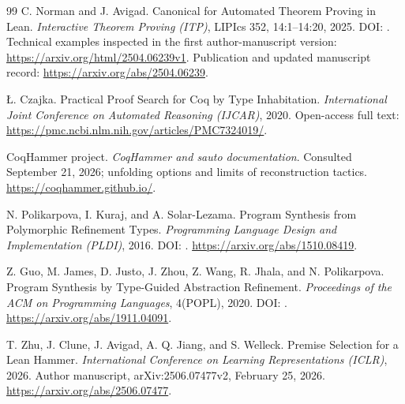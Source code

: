 \begin{thebibliography}{99}
C. Norman and J. Avigad.
Canonical for Automated Theorem Proving in Lean.
\emph{Interactive Theorem Proving (ITP)}, LIPIcs 352, 14:1--14:20, 2025.
DOI: .
Technical examples inspected in the first author-manuscript version:
\url{https://arxiv.org/html/2504.06239v1}.
Publication and updated manuscript record:
\url{https://arxiv.org/abs/2504.06239}.

\L{}. Czajka.
Practical Proof Search for Coq by Type Inhabitation.
\emph{International Joint Conference on Automated Reasoning (IJCAR)}, 2020.
Open-access full text:
\url{https://pmc.ncbi.nlm.nih.gov/articles/PMC7324019/}.

CoqHammer project.
\emph{CoqHammer and sauto documentation}.
Consulted September 21, 2026; unfolding options and limits of reconstruction tactics.
\url{https://coqhammer.github.io/}.

N. Polikarpova, I. Kuraj, and A. Solar-Lezama.
Program Synthesis from Polymorphic Refinement Types.
\emph{Programming Language Design and Implementation (PLDI)}, 2016.
DOI: .
\url{https://arxiv.org/abs/1510.08419}.

Z. Guo, M. James, D. Justo, J. Zhou, Z. Wang, R. Jhala, and N. Polikarpova.
Program Synthesis by Type-Guided Abstraction Refinement.
\emph{Proceedings of the ACM on Programming Languages}, 4(POPL), 2020.
DOI: .
\url{https://arxiv.org/abs/1911.04091}.

T. Zhu, J. Clune, J. Avigad, A. Q. Jiang, and S. Welleck.
Premise Selection for a Lean Hammer.
\emph{International Conference on Learning Representations (ICLR)}, 2026.
Author manuscript, arXiv:2506.07477v2, February 25, 2026.
\url{https://arxiv.org/abs/2506.07477}.

\end{thebibliography}
